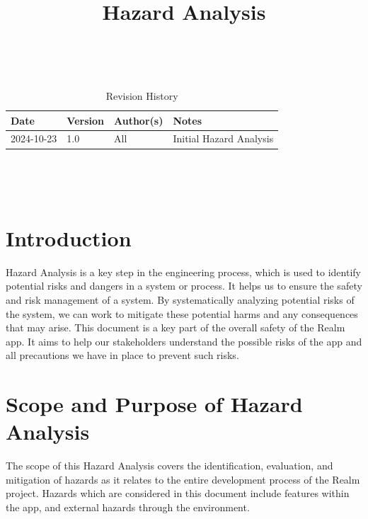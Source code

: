 \documentclass{article}
\title{Hazard Analysis\\\progname}
\author{\authname}
\date{}
\begin{document}
\maketitle
\thispagestyle{empty}

~\newpage


\begin{table}[hp]
    \caption{Revision History} \label{rev_history_table}
    \begin{tabularx}{\textwidth}{p{3cm}p{2cm}p{3cm}X}
        \toprule {\textbf{Date}} & {\textbf{Version}} & {\textbf{Author(s)}} & {\textbf{Notes}} \\
        \midrule
        2024-10-23               & 1.0         & All      & Initial Hazard Analysis      \\
        \bottomrule
    \end{tabularx}
\end{table}

~\newpage

\tableofcontents

~\newpage


\section{Introduction}

Hazard Analysis is a key step in the engineering process, which is used to identify potential risks and dangers in a system or process. It helps us to ensure the safety and risk management of a system. By systematically analyzing potential risks of the system, we can work to mitigate these potential harms and any consequences that may arise. This document is a key part of the overall safety of the Realm app. It aims to help our stakeholders understand the possible risks of the app and all precautions we have in place to prevent such risks.

\section{Scope and Purpose of Hazard Analysis}

The scope of this Hazard Analysis covers the identification, evaluation, and mitigation of hazards as it relates to the entire development process of the Realm project. Hazards which are considered in this document include features within the app, and external hazards through the environment.\\
\end{document}
